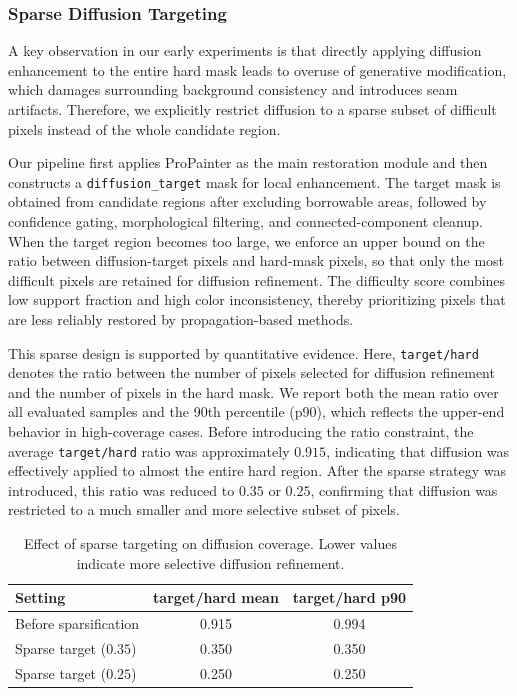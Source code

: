 \subsubsection{Sparse Diffusion Targeting}

A key observation in our early experiments is that directly applying diffusion enhancement to the entire hard mask leads to overuse of generative modification, which damages surrounding background consistency and introduces seam artifacts.
Therefore, we explicitly restrict diffusion to a sparse subset of difficult pixels instead of the whole candidate region.

Our pipeline first applies ProPainter as the main restoration module and then constructs a \texttt{diffusion\_target} mask for local enhancement.
The target mask is obtained from candidate regions after excluding borrowable areas, followed by confidence gating, morphological filtering, and connected-component cleanup.
When the target region becomes too large, we enforce an upper bound on the ratio between diffusion-target pixels and hard-mask pixels, so that only the most difficult pixels are retained for diffusion refinement.
The difficulty score combines low support fraction and high color inconsistency, thereby prioritizing pixels that are less reliably restored by propagation-based methods.

This sparse design is supported by quantitative evidence.
Here, \texttt{target/hard} denotes the ratio between the number of pixels selected for diffusion refinement and the number of pixels in the hard mask.
We report both the mean ratio over all evaluated samples and the 90th percentile (p90), which reflects the upper-end behavior in high-coverage cases.
Before introducing the ratio constraint, the average \texttt{target/hard} ratio was approximately \(0.915\), indicating that diffusion was effectively applied to almost the entire hard region.
After the sparse strategy was introduced, this ratio was reduced to \(0.35\) or \(0.25\), confirming that diffusion was restricted to a much smaller and more selective subset of pixels.

\begin{table}[t]
\centering
\caption{Effect of sparse targeting on diffusion coverage. Lower values indicate more selective diffusion refinement.}
\label{tab:sparse_target}
\begin{tabular}{lcc}
\toprule
Setting & target/hard mean & target/hard p90 \\
\midrule
Before sparsification & 0.915 & 0.994 \\
Sparse target (\(0.35\)) & 0.350 & 0.350 \\
Sparse target (\(0.25\)) & 0.250 & 0.250 \\
\bottomrule
\end{tabular}
\end{table}

